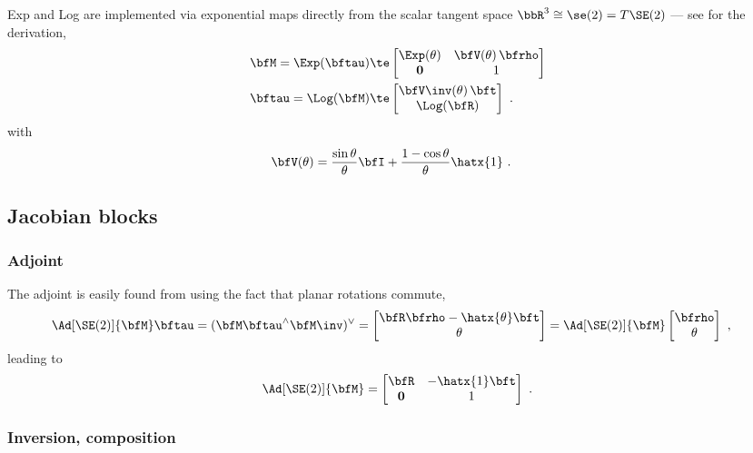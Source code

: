 Exp and Log are implemented via exponential maps directly from the scalar tangent space $\bbR^3\cong\se(2)=\mtan{\SE(2)}$ ---  see \cite{EADE-Lie} for the derivation,
%
\begin{align}
  \bfM = \Exp(\bftau) 
    &\te \begin{bmatrix}\Exp(\theta) & \bfV(\theta)\,\bfrho \\ \bf0 & 1  \end{bmatrix}  \label{equ:SE2_Exp} \\
  \bftau = \Log(\bfM) 
    &\te \begin{bmatrix} \bfV\inv(\theta)\, \bft \\ \Log(\bfR) \end{bmatrix}~.
\end{align}
%
with
%
\begin{align}
  \bfV(\theta)
  &= 
  \frac{\sin\theta}{\theta}\bfI + \frac{1-\cos\theta}{\theta}\hatx{1}
  ~.
\end{align}

\subsection{Jacobian blocks}
\label{sec:derivatives_SE2}

\subsubsection{Adjoint}

The adjoint is easily found from  using the fact that planar rotations commute,
%
\begin{align*}
\Ad[\SE(2)]{\bfM} \bftau &= (\bfM \bftau^\wedge \bfM\inv)^\vee 
= \begin{bmatrix}
\bfR\bfrho-\hatx{\theta}\bft \\ \theta
\end{bmatrix} = \Ad[\SE(2)]{\bfM} \begin{bmatrix}
\bfrho\\\theta
\end{bmatrix}
~,
\end{align*}
%
leading to
%
\begin{align}
\Ad[\SE(2)]{\bfM} = \begin{bmatrix}
\bfR & -\hatx{1}\bft \\ \bf0 & 1
\end{bmatrix}
~.
\end{align}


\subsubsection{Inversion, composition}

